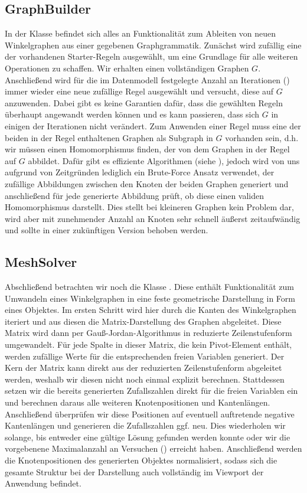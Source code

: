 \subsection{GraphBuilder}
In der  Klasse befindet sich alles an Funktionalität zum Ableiten von neuen Winkelgraphen aus einer gegebenen
Graphgrammatik. Zunächst wird zufällig eine der vorhandenen Starter-Regeln ausgewählt, um eine Grundlage für alle weiteren Operationen
zu schaffen. Wir erhalten einen vollständigen Graphen \(G\). Anschließend wird für die im Datenmodell festgelegte Anzahl an Iterationen
() immer wieder eine neue zufällige Regel ausgewählt und versucht, diese auf \(G\) anzuwenden. Dabei gibt es keine Garantien
dafür, dass die gewählten Regeln überhaupt angewandt werden können und es kann passieren, dass sich \(G\) in einigen der Iterationen
nicht verändert. Zum Anwenden einer Regel muss eine der beiden in der Regel enthaltenen Graphen als Subgraph in \(G\) vorhanden sein,
d.h. wir müssen einen Homomorphismus finden, der von dem Graphen in der Regel auf \(G\) abbildet. Dafür gibt es effiziente Algorithmen (siehe \cite{8_eppstein}),
jedoch wird von uns aufgrund von Zeitgründen lediglich ein Brute-Force Ansatz verwendet, der zufällige Abbildungen zwischen den Knoten
der beiden Graphen generiert und anschließend für jede generierte Abbildung prüft, ob diese einen validen Homomorphismus darstellt.
Dies stellt bei kleineren Graphen kein Problem dar, wird aber mit zunehmender Anzahl an Knoten sehr schnell äußerst zeitaufwändig und
sollte in einer zukünftigen Version behoben werden.

\subsection{MeshSolver}
Abschließend betrachten wir noch die Klasse . Diese enthält Funktionalität zum Umwandeln eines Winkelgraphen in eine
feste geometrische Darstellung in Form eines  Objektes. Im ersten Schritt wird hier durch die Kanten des
Winkelgraphen iteriert und aus diesen die Matrix-Darstellung des Graphen abgeleitet. Diese Matrix wird dann per Gauß-Jordan-Algorithmus \cite{47_meyer}
in reduzierte Zeilenstufenform umgewandelt. Für jede Spalte in dieser Matrix, die kein Pivot-Element enthält, werden zufällige
Werte für die entsprechenden freien Variablen generiert. Der Kern der Matrix kann direkt aus der reduzierten Zeilenstufenform
abgeleitet werden, weshalb wir diesen nicht noch einmal explizit berechnen. Stattdessen setzen wir die bereits generierten Zufallszahlen
direkt für die freien Variablen ein und berechnen daraus alle weiteren Knotenpositionen und Kantenlängen. Anschließend überprüfen wir
diese Positionen auf eventuell auftretende negative Kantenlängen und generieren die Zufallszahlen ggf. neu. Dies wiederholen wir solange,
bis entweder eine gültige Lösung gefunden werden konnte oder wir die vorgebenene Maximalanzahl an Versuchen () erreicht haben.
Anschließend werden die Knotenpositionen des generierten  Objektes normalisiert, sodass sich die gesamte Struktur
bei der Darstellung auch vollständig im Viewport der Anwendung befindet.


